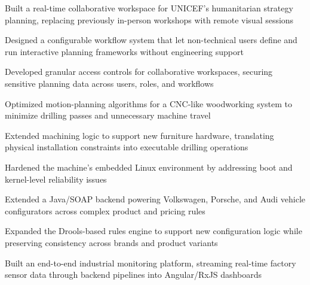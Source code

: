 \begin{bullets}
\item Built a real-time collaborative workspace for UNICEF's humanitarian strategy planning, replacing previously in-person workshops with remote visual sessions
\item Designed a configurable workflow system that let non-technical users define and run interactive planning frameworks without engineering support
\item Developed granular access controls for collaborative workspaces, securing sensitive planning data across users, roles, and workflows
\end{bullets}

\jobsep
{}

\begin{bullets}
\item Optimized motion-planning algorithms for a CNC-like woodworking system to minimize drilling passes and unnecessary machine travel
\item Extended machining logic to support new furniture hardware, translating physical installation constraints into executable drilling operations
\item Hardened the machine’s embedded Linux environment by addressing boot and kernel-level reliability issues
\end{bullets}

\jobsep
{}

\begin{bullets}
\item Extended a Java/SOAP backend powering Volkswagen, Porsche, and Audi vehicle configurators across complex product and pricing rules
\item Expanded the Drools-based rules engine to support new configuration logic while preserving consistency across brands and product variants
\end{bullets}

\jobsep
{}

\begin{bullets}
\item Built an end-to-end industrial monitoring platform, streaming real-time factory sensor data through backend pipelines into Angular/RxJS dashboards
\end{bullets}
